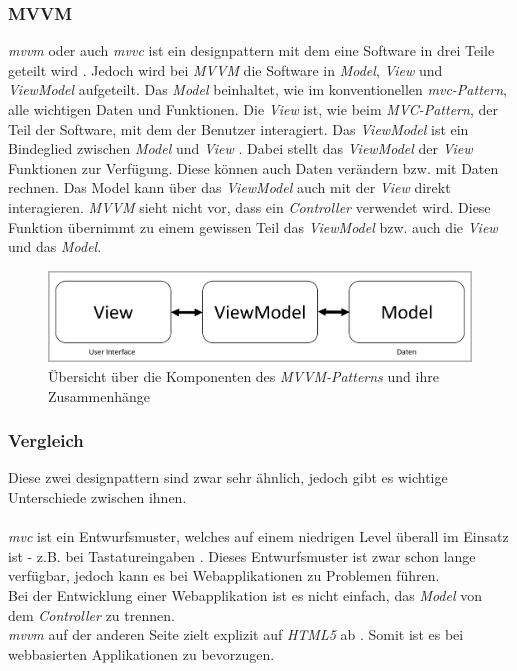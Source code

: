 \subsubsection{MVVM}
\textit{\Gls{mvvm}} oder auch \textit{\Gls{mvvc}} ist ein \Gls{designpattern} mit dem eine Software in drei Teile geteilt wird \cite{mvvm_vue}. Jedoch wird bei \textit{MVVM} die Software in \textit{Model}, \textit{View} und \textit{ViewModel} aufgeteilt. 
Das \textit{Model} beinhaltet, wie im konventionellen \textit{\Gls{mvc}-Pattern}, alle wichtigen Daten und Funktionen. 
Die \textit{View} ist, wie beim \textit{MVC-Pattern}, der Teil der Software, mit dem der Benutzer interagiert. 
Das \textit{ViewModel} ist ein Bindeglied zwischen \textit{Model} und \textit{View} \cite{mvvm_vue}. Dabei stellt das \textit{ViewModel} der \textit{View} Funktionen zur Verfügung. Diese können auch Daten verändern bzw. mit Daten rechnen. Das Model kann über das \textit{ViewModel} auch mit der \textit{View} direkt interagieren. 
\textit{MVVM} sieht nicht vor, dass ein \textit{Controller} verwendet wird. Diese Funktion übernimmt zu einem gewissen Teil das \textit{ViewModel} bzw. auch die \textit{View} und das \textit{Model}.
\begin{figure}[H]
	\centering
	\includegraphics[width=0.8\linewidth]{images/rfoster_study/mvvm}
	\caption[Übersicht des \textit{MVVM-Patterns}]{Übersicht über die Komponenten des \textit{MVVM-Patterns} und ihre Zusammenhänge}
	\label{fig:mvvm}
\end{figure}
\subsubsection{Vergleich}
Diese zwei \Gls{designpattern} sind zwar sehr ähnlich, jedoch gibt es wichtige Unterschiede zwischen ihnen.\\\\
\textit{\Gls{mvc}} ist ein Entwurfsmuster, welches auf einem niedrigen Level überall im Einsatz ist - z.B. bei Tastatureingaben \cite{mvc}. Dieses Entwurfsmuster ist zwar schon lange verfügbar, jedoch kann es bei Webapplikationen zu Problemen führen.\\
Bei der Entwicklung einer Webapplikation ist es nicht einfach, das \textit{Model} von dem \textit{Controller} zu trennen.\\
\textit{\Gls{mvvm}} auf der anderen Seite zielt explizit auf \textit{HTML5} ab \cite{mvvm_vue}. Somit ist es bei webbasierten Applikationen zu bevorzugen.
\newpage
